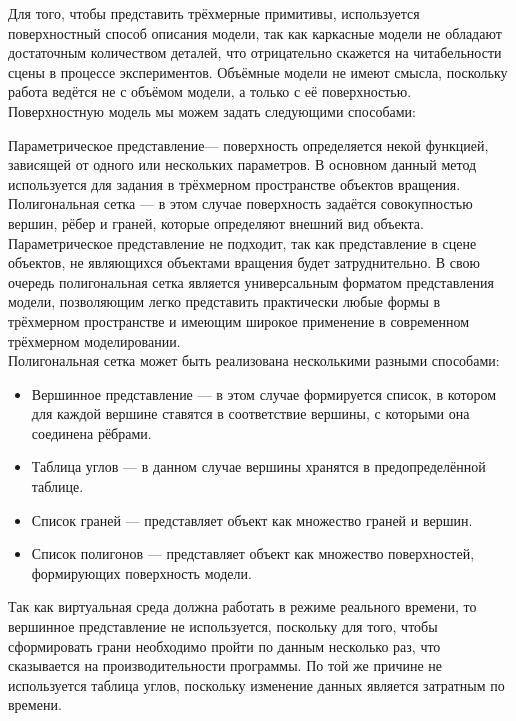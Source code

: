 Для того, чтобы представить трёхмерные примитивы, используется поверхностный способ описания модели, так как каркасные модели не обладают достаточным количеством деталей, что отрицательно скажется на читабельности сцены в процессе экспериментов. Объёмные модели не имеют смысла, поскольку работа ведётся не с объёмом модели, а только с её поверхностью.\\

Поверхностную модель мы можем задать следующими способами:

Параметрическое представление— поверхность определяется некой функцией, зависящей от одного или нескольких параметров. В основном данный метод используется для задания в трёхмерном пространстве объектов вращения.\\

Полигональная сетка — в этом случае поверхность задаётся совокупностью вершин, рёбер и граней, которые определяют внешний вид объекта.\\

Параметрическое представление не подходит, так как представление в сцене объектов, не являющихся объектами вращения будет затруднительно. В свою очередь полигональная сетка является универсальным форматом представления модели, позволяющим легко представить практически любые формы в трёхмерном пространстве и имеющим широкое применение в современном трёхмерном моделировании.\\

Полигональная сетка может быть реализована несколькими разными способами:
\begin{itemize}
	\item Вершинное представление — в этом случае формируется список, в котором для каждой вершине ставятся в соответствие вершины, с которыми она соединена рёбрами.
	\item Таблица углов — в данном случае вершины хранятся в предопределённой таблице. 
	\item Список граней — представляет объект как множество граней и вершин.
	\item Список полигонов — представляет объект как множество поверхностей, формирующих поверхность модели. 
\end{itemize}

Так как виртуальная среда должна работать в режиме реального времени, то вершинное представление не используется, поскольку для того, чтобы сформировать грани необходимо пройти по данным несколько раз, что сказывается на производительности программы. По той же причине не используется таблица углов, поскольку изменение данных является затратным по времени.\\

